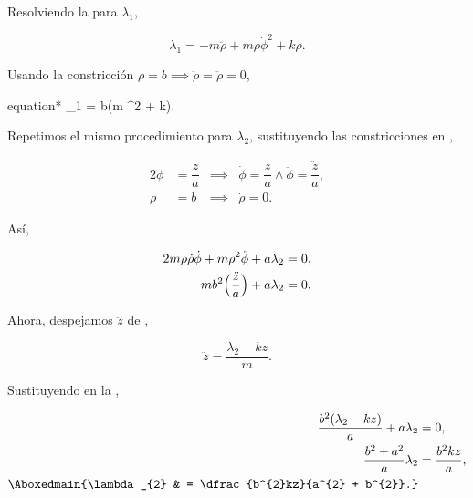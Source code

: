 \documentclass[../main.tex]{subfiles}
\begin{document}
\begin{problema}
	Resolviendo la  para \(\lambda_{1}\),

	\begin{equation*}
		\lambda_{1} = -m \ddot{\rho} + m\rho \dot{\phi}^{2} + k\rho.
	\end{equation*}

	Usando la constricción \(\rho = b \implies \ddot{\rho} = \ddot{\rho} = 0\),

	\begin{empheq}[box = \mainresult]{equation*}
		\lambda_{1} = b(m \dot{\phi}^{2} + k).
	\end{empheq}

	Repetimos el mismo procedimiento para \(\lambda_{2}\), sustituyendo
	las constricciones en ,

	\begin{alignat*}{2}
		\phi & = \dfrac{z}{a} & {}\implies{} & \dot{\phi} = \dfrac{\dot{z}}{a} \wedge \ddot{\phi} = \dfrac{\ddot{z}}{a}, \\
		\rho & = b            & {}\implies{} & \dot{\rho} = 0.
	\end{alignat*}

	Así,

	\begin{align}
		2m\rho \dot{\rho} \dot{\phi} + m\rho^{2} \ddot{\phi} + a\lambda_{2} & = 0,\nonumber \\
		mb^{2}\Bigl(\dfrac{\ddot{z}}{a}\Bigr) + a\lambda_{2}                & = 0.
		\label{eq:l2-2nd-eom}
	\end{align}

	Ahora, despejamos \(\ddot{z}\) de ,

	\begin{equation*}
		\ddot{z} = \dfrac{\lambda_{2} - kz}{m}.
	\end{equation*}

	Sustituyendo en la ,

	\begin{align*}
		\dfrac{b^{2}(\lambda_{2} - kz)}{a} + a\lambda_{2} & = 0,                               \\
		\dfrac{b^{2} + a^{2}}{a}\lambda_{2}               & = \dfrac{b^{2}kz}{a},              \\
		\Aboxedmain{\lambda_{2}                           & = \dfrac{b^{2}kz}{a^{2} + b^{2}}.}
	\end{align*}
\end{problema}
\end{document}
